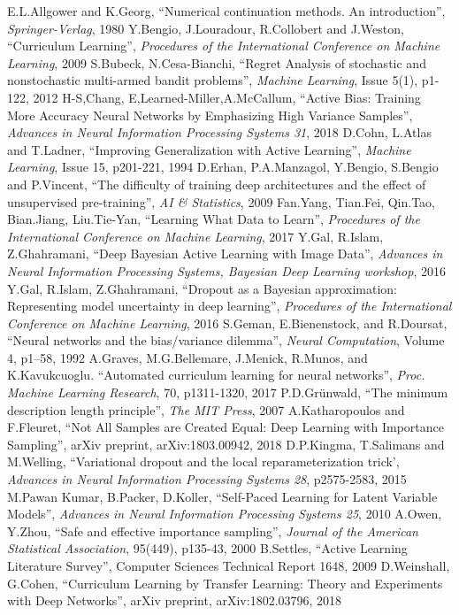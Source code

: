 \documentclass[a4paper,11pt]{article}
\begin{document}
\newpage

\begin{thebibliography}{1}
E.L.Allgower and K.Georg, ``Numerical continuation methods. An introduction'', \textit{Springer-Verlag}, 1980
Y.Bengio, J.Louradour, R.Collobert and J.Weston, ``Curriculum Learning'', \textit{Procedures of the International Conference on Machine Learning}, 2009
S.Bubeck, N.Cesa-Bianchi, ``Regret Analysis of stochastic and nonstochastic multi-armed bandit problems'', \textit{Machine Learning}, Issue 5(1), p1-122, 2012
H-S,Chang, E,Learned-Miller,A.McCallum, ``Active Bias: Training More Accuracy Neural Networks by Emphasizing High Variance Samples'', \textit{Advances in Neural Information Processing Systems 31}, 2018
D.Cohn, L.Atlas and T.Ladner, ``Improving Generalization with Active Learning'', \textit{Machine Learning}, Issue 15, p201-221, 1994
D.Erhan, P.A.Manzagol, Y.Bengio, S.Bengio and P.Vincent, ``The difficulty of training deep architectures and the effect of unsupervised pre-training'', \textit{AI \& Statistics}, 2009
Fan.Yang, Tian.Fei, Qin.Tao, Bian.Jiang, Liu.Tie-Yan, ``Learning What Data to Learn'', \textit{Procedures of the International Conference on Machine Learning}, 2017
Y.Gal, R.Islam, Z.Ghahramani, ``Deep Bayesian Active Learning with Image Data'', \textit{Advances in Neural Information Processing Systems, Bayesian Deep Learning workshop}, 2016
Y.Gal, R.Islam, Z.Ghahramani, ``Dropout as a Bayesian approximation: Representing model uncertainty in deep learning'', \textit{Procedures of the International Conference on Machine Learning}, 2016
S.Geman, E.Bienenstock, and R.Doursat, ``Neural networks and the bias/variance dilemma'', \textit{Neural Computation}, Volume 4, p1–58, 1992
A.Graves, M.G.Bellemare, J.Menick, R.Munos, and K.Kavukcuoglu. ``Automated curriculum learning for neural networks'', \textit{Proc. Machine Learning Research}, 70, p1311-1320, 2017
P.D.Gr{\"u}nwald, ``The minimum description length principle'', \textit{The MIT Press}, 2007
A.Katharopoulos and F.Fleuret, ``Not All Samples are Created Equal: Deep Learning with Importance Sampling'', arXiv preprint, arXiv:1803.00942, 2018
D.P.Kingma, T.Salimans and M.Welling, ``Variational dropout and the local reparameterization trick', \textit{Advances in Neural Information Processing Systems 28}, p2575-2583, 2015
M.Pawan Kumar, B.Packer, D.Koller, ``Self-Paced Learning for Latent Variable Models'', \textit{Advances in Neural Information Processing Systems 25}, 2010
A.Owen, Y.Zhou, ``Safe and effective importance sampling'', \textit{Journal of the American Statistical Association}, 95(449), p135-43, 2000
B.Settles, ``Active Learning Literature Survey'', Computer Sciences Technical Report 1648, 2009
D.Weinshall, G.Cohen, ``Curriculum Learning by Transfer Learning: Theory and Experiments with Deep Networks'', arXiv preprint, arXiv:1802.03796, 2018
\end{thebibliography}
\end{document}
